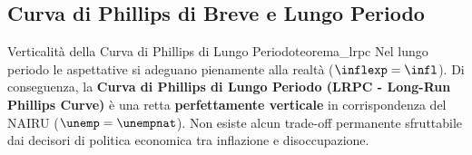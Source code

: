 \subsection{Curva di Phillips di Breve e Lungo Periodo}

\begin{teorema}{Verticalità della Curva di Phillips di Lungo Periodo}{teorema_lrpc}
Nel lungo periodo le aspettative si adeguano pienamente alla realtà ($\inflexp = \infl$).
Di conseguenza, la \textbf{Curva di Phillips di Lungo Periodo (LRPC - Long-Run Phillips Curve)} è una retta \textbf{perfettamente verticale} in corrispondenza del NAIRU ($\unemp = \unempnat$).
Non esiste alcun trade-off permanente sfruttabile dai decisori di politica economica tra inflazione e disoccupazione.
\end{teorema}

